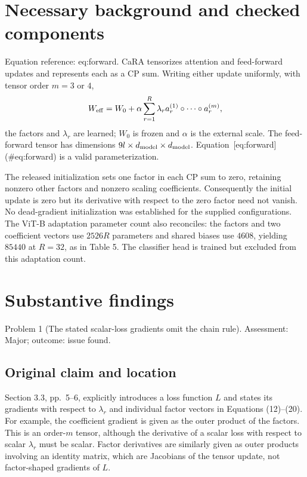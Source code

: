 \documentclass[10pt]{article}
\begin{document}
\section*{Necessary background and checked components}
Equation reference: eq:forward. CaRA tensorizes attention and feed-forward updates and represents each as a CP sum. Writing either update uniformly, with tensor order \(m=3\) or \(4\), \[
 W_{\rm eff}=W_0+\alpha\sum_{r=1}^{R}\lambda_r
       a_r^{(1)}\circ\cdots\circ a_r^{(m)},\] the factors and \(\lambda_r\) are learned; \(W_0\) is frozen and \(\alpha\) is the external scale. The feed-forward tensor has dimensions \(9l\times d_{\rm model}\times d_{\rm model}\). Equation [eq:forward] (\#eq:forward) is a valid parameterization.\par
The released initialization sets one factor in each CP sum to zero, retaining nonzero other factors and nonzero scaling coefficients. Consequently the initial update is zero but its derivative with respect to the zero factor need not vanish. No dead-gradient initialization was established for the supplied configurations. The ViT-B adaptation parameter count also reconciles: the factors and two coefficient vectors use \(2526R\) parameters and shared biases use \(4608\), yielding \(85440\) at \(R=32\), as in Table 5. The classifier head is trained but excluded from this adaptation count.\par
\section*{Substantive findings}
Problem 1 (The stated scalar-loss gradients omit the chain rule).  Assessment: Major; outcome: issue found.\par
\subsection*{Original claim and location}
Section 3.3, pp. 5–6, explicitly introduces a loss function \(L\) and states its gradients with respect to \(\lambda_r\) and individual factor vectors in Equations (12)–(20). For example, the coefficient gradient is given as the outer product of the factors. This is an order-\(m\) tensor, although the derivative of a scalar loss with respect to scalar \(\lambda_r\) must be scalar. Factor derivatives are similarly given as outer products involving an identity matrix, which are Jacobians of the tensor update, not factor-shaped gradients of \(L\).\par
\end{document}
